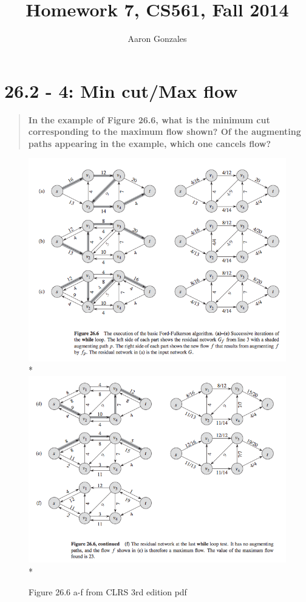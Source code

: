 \documentclass[titlepage]{article}\usepackage[]{graphicx}\usepackage[]{color}
\begin{document}
\title{Homework 7, CS561, Fall 2014}
\author{Aaron Gonzales}
\maketitle


\section{26.2 - 4: Min cut/Max flow}
  \begin{quote}
    \textbf{In the example of Figure 26.6, what is the minimum cut corresponding
    to the maximum flow shown? Of the augmenting paths appearing in the
    example, which one cancels flow?}
  \end{quote}

  \begin{figure}
    \begin{center}
    \includegraphics[scale=0.40]{26.6a.png}\\*
    \includegraphics[scale=0.40]{26.6b.png}\\*
  \end{center}
  \label{fig:26.6a}
  \caption{Figure 26.6 a-f from CLRS 3rd edition pdf}
  \end{figure}
\end{document}
